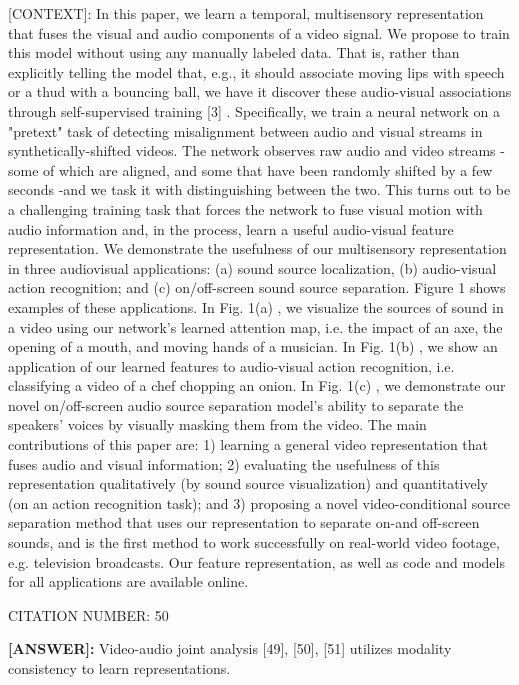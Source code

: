 {[CONTEXT]: In this paper, we learn a temporal, multisensory representation that fuses the visual and audio components of a video signal. We propose to train this model without using any manually labeled data. That is, rather than explicitly telling the model that, e.g., it should associate moving lips with speech or a thud with a bouncing ball, we have it discover these audio-visual associations through self-supervised training [3] . Specifically, we train a neural network on a "pretext" task of detecting misalignment between audio and visual streams in synthetically-shifted videos. The network observes raw audio and video streams -some of which are aligned, and some that have been randomly shifted by a few seconds -and we task it with distinguishing between the two. This turns out to be a challenging training task that forces the network to fuse visual motion with audio information and, in the process, learn a useful audio-visual feature representation.
We demonstrate the usefulness of our multisensory representation in three audiovisual applications: (a) sound source localization, (b) audio-visual action recognition; and (c) on/off-screen sound source separation. Figure 1 shows examples of these applications. In Fig. 1(a) , we visualize the sources of sound in a video using our network's learned attention map, i.e. the impact of an axe, the opening of a mouth, and moving hands of a musician. In Fig. 1(b) , we show an application of our learned features to audio-visual action recognition, i.e. classifying a video of a chef chopping an onion. In Fig. 1(c) , we demonstrate our novel on/off-screen audio source separation model's ability to separate the speakers' voices by visually masking them from the video. The main contributions of this paper are: 1) learning a general video representation that fuses audio and visual information; 2) evaluating the usefulness of this representation qualitatively (by sound source visualization) and quantitatively (on an action recognition task); and 3) proposing a novel video-conditional source separation method that uses our representation to separate on-and off-screen sounds, and is the first method to work successfully on real-world video footage, e.g. television broadcasts. Our feature representation, as well as code and models for all applications are available online.

CITATION NUMBER: 50


\textbf{[ANSWER]:} Video-audio joint analysis [49], [50], [51] utilizes modality consistency to learn representations.
}

